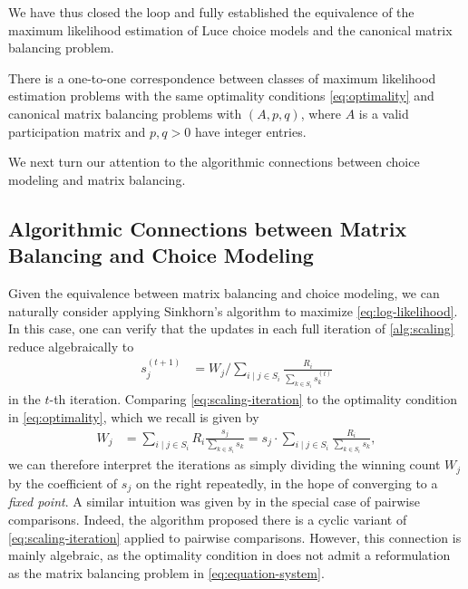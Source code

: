 We have thus closed the loop and fully established the equivalence of the maximum likelihood estimation of Luce choice models and the canonical matrix balancing problem.
\begin{corollary}
    There is a one-to-one correspondence between classes of maximum likelihood estimation problems with the same optimality conditions \eqref{eq:optimality} and canonical matrix balancing problems with $(A,p,q)$, where $A$ is a valid participation matrix and $p,q>0$ have integer entries. 
\end{corollary}
We next turn our attention to the algorithmic connections between choice modeling and matrix balancing. %
\subsection{Algorithmic Connections between Matrix Balancing and Choice Modeling}
\label{subsec:IPF}
 Given the equivalence between matrix balancing and choice modeling, we can naturally consider applying Sinkhorn's algorithm to maximize \eqref{eq:log-likelihood}. In this case, one can verify that the updates in each full iteration of \cref{alg:scaling} reduce algebraically to
\begin{align}
\label{eq:scaling-iteration}
s_{j}^{(t+1)} & =W_{j}/\sum_{i\mid j\in S_{i}}\frac{R_i}{\sum_{k\in S_{i}}s_{k}^{(t)}}
\end{align}
 in the $t$-th iteration. 
 Comparing \eqref{eq:scaling-iteration} to the optimality condition in \eqref{eq:optimality}, which we recall is given by 
\begin{align*}
 W_j & =\sum_{i\mid j\in S_{i}} R_i\frac{s_{j}}{\sum_{k\in S_{i}}s_{k}}= s_{j} \cdot \sum_{i\mid j\in S_{i}}\frac{R_i}{\sum_{k\in S_{i}}s_{k}},
 \end{align*}
we can therefore interpret the iterations as simply dividing the winning count $W_j$ by the coefficient of $s_j$ on the right repeatedly, in the hope of converging to a \emph{fixed point}. A similar intuition was given by \citet{ford1957solution} in the special case of pairwise comparisons. Indeed, the algorithm proposed there is a cyclic variant of \eqref{eq:scaling-iteration} applied to pairwise comparisons. However, this connection is mainly algebraic, as the optimality condition in \citet{ford1957solution} does not admit a reformulation as the matrix balancing problem in \eqref{eq:equation-system}.

